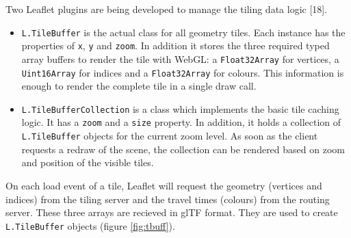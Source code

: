       Two Leaflet plugins are being developed to manage the tiling data logic [18].\par
      \begin{itemize}
        \item \texttt{L.TileBuffer} is the actual class for all geometry tiles. Each instance has the properties of \texttt{x}, \texttt{y} and \texttt{zoom}. In addition it stores the three required typed array buffers to render the tile with WebGL: a \texttt{Float32Array} for vertices, a \texttt{Uint16Array} for indices and a \texttt{Float32Array} for colours. This information is enough to render the complete tile in a single draw call.
        \item \texttt{L.TileBufferCollection} is a class which implements the basic tile caching logic. It has a \texttt{zoom} and a \texttt{size} property. In addition, it holds a collection of \texttt{L.Tile\-Buffer} objects for the current zoom level. As soon as the client requests a redraw of the scene, the collection can be rendered based on zoom and position of the visible tiles.
      \end{itemize}
      On each load event of a tile, Leaflet will request the geometry (vertices and indices) from the tiling server and the travel times (colours) from the routing server. These three arrays are recieved in glTF format. They are used to create \texttt{L.TileBuffer} objects (figure \ref{fig:tbuff}).\par


